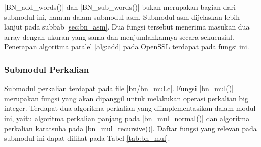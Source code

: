       |BN_add_words()| dan |BN_sub_words()| bukan merupakan bagian dari submodul ini, namun dalam submodul asm. Submodul asm dijelaskan lebih lanjut pada subbab \ref{sec:bn_asm}. Dua fungsi tersebut menerima masukan dua array dengan ukuran yang sama dan menjumlahkannya secara sekuensial. Penerapan algoritma paralel \ref{alg:add} pada OpenSSL terdapat pada fungsi ini.

    \subsubsection{Submodul Perkalian}
      Submodul perkalian terdapat pada file |bn/bn_mul.c|. Fungsi |bn_mul()| merupakan fungsi yang akan dipanggil untuk melakukan operasi perkalian big integer. Terdapat dua algoritma perkalian yang diimplementasikan dalam modul ini, yaitu algoritma perkalian panjang pada |bn_mul_normal()| dan algoritma perkalian karatsuba pada |bn_mul_recursive()|. Daftar fungsi yang relevan pada submodul ini dapat dilihat pada Tabel \ref{tab:bn_mul}.

